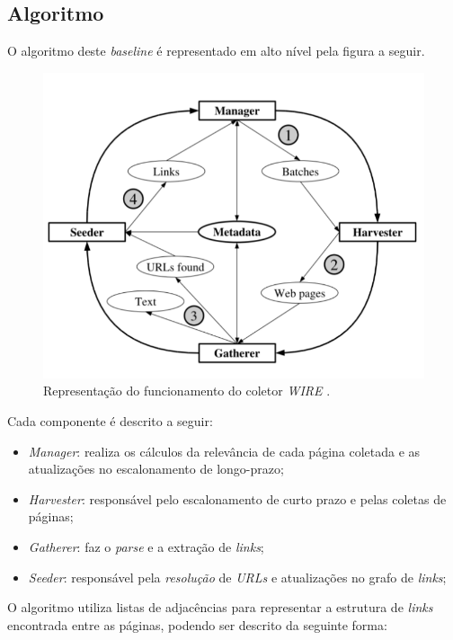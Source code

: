 \documentclass[a4paper,12pt,titlepage]{article}
\begin{document}
\subsection{Algoritmo}

O algoritmo deste \textit{baseline} é representado em alto nível pela figura a seguir.

\begin{figure}[H]
     \centering
     \includegraphics[scale=0.45]{figures/wire-crawling-architecture-2.png}
     \caption{Representação do funcionamento do coletor \textit{WIRE} \cite{carlos}.}
     \label{bsp}
\end{figure}

Cada componente é descrito a seguir: 

\begin{itemize}
\item \textit{Manager}: realiza os cálculos da relevância de cada página coletada e as atualizações no escalonamento de longo-prazo;
\item \textit{Harvester}: responsável pelo escalonamento de curto prazo e pelas coletas de páginas;
\item \textit{Gatherer}: faz o \textit{parse} e a extração de \textit{links};
\item \textit{Seeder}: responsável pela \textit{resolução} de \textit{URLs} e atualizações no grafo de \textit{links};
\end{itemize} 

O algoritmo utiliza listas de adjacências para representar a estrutura de \textit{links} encontrada entre as páginas, podendo ser descrito da seguinte forma:
\end{document}
